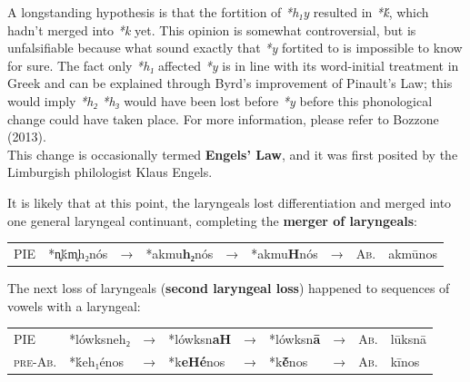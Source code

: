 \documentclass[svgnames,x11names,b5paper]{book}
\begin{document}
            A longstanding hypothesis is that the fortition of \textit{*h₁y} resulted in \textit{*ḱ}, which hadn't merged into \textit{*k} yet. This opinion is somewhat controversial, but is unfalsifiable because what sound exactly that \textit{*y} fortited to is impossible to know for sure. The fact only \textit{*h₁} affected \textit{*y} is in line with its word-initial treatment in Greek and can be explained through Byrd's improvement of Pinault's Law; this would imply \textit{*h₂ *h₃} would have been lost before \textit{*y} before this phonological change could have taken place. For more information, please refer to Bozzone (2013).\\
This change is occasionally termed \textbf{Engels' Law}, and it was first posited by the Limburgish philologist Klaus Engels.

        It is likely that at this point, the laryngeals lost differentiation and merged into one general laryngeal continuant, completing the \textbf{merger of laryngeals}:

            \begin{table}[H]
                \begin{center}
                \begin{tabular}{llcllllll}
                \textsc{PIE} & *n̥ḱm̥h₂nós & → & *akmu\textbf{h₂}nós & → & *akmu\textbf{H}nós & → & \textsc{Ab.} & akmūnos\\
                \end{tabular}
                \end{center}
                \end{table}
        
        The next loss of laryngeals (\textbf{second laryngeal loss}) happened to sequences of vowels with a laryngeal:

            \begin{table}[H]
                \begin{center}
                \begin{tabular}{llcllllll}
                \textsc{PIE} & *lówksneh₂ & → & *lówksn\textbf{aH} & → & *lówksn\textbf{ā} & → & \textsc{Ab.} & lūksnā\\
                \textsc{pre-Ab.} & *ḱeh₁énos & → & *k\textbf{eHé}nos & → & *k\textbf{ḗ}nos & → & \textsc{Ab.} & kīnos\\
                \end{tabular}
                \end{center}
                \end{table}
        
\end{document}
